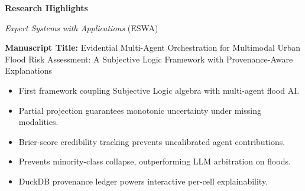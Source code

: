 \documentclass[11pt,a4paper]{article}
\begin{document}
\thispagestyle{empty}

\begin{center}
{\Large \bf Research Highlights \par}
\vspace{0.5em}
{\large \textit{Expert Systems with Applications} (ESWA) \par}
\end{center}

\vspace{1.5em}

\noindent \textbf{Manuscript Title:} Evidential Multi-Agent Orchestration for Multimodal Urban Flood Risk Assessment: A Subjective Logic Framework with Provenance-Aware Explanations

\vspace{1.5em}

\begin{itemize}[leftmargin=*,itemsep=1em]
    \item First framework coupling Subjective Logic algebra with multi-agent flood AI.
    \item Partial projection guarantees monotonic uncertainty under missing modalities.
    \item Brier-score credibility tracking prevents uncalibrated agent contributions.
    \item Prevents minority-class collapse, outperforming LLM arbitration on floods.
    \item DuckDB provenance ledger powers interactive per-cell explainability.
\end{itemize}
\end{document}
